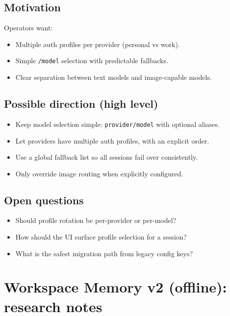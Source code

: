 \subsection{Motivation}


Operators want:

\begin{itemize}
  \item Multiple auth profiles per provider (personal vs work).
  \item Simple \texttt{/model} selection with predictable fallbacks.
  \item Clear separation between text models and image-capable models.
\end{itemize}


\subsection{Possible direction (high level)}


\begin{itemize}
  \item Keep model selection simple: \texttt{provider/model} with optional aliases.
  \item Let providers have multiple auth profiles, with an explicit order.
  \item Use a global fallback list so all sessions fail over consistently.
  \item Only override image routing when explicitly configured.
\end{itemize}


\subsection{Open questions}


\begin{itemize}
  \item Should profile rotation be per-provider or per-model?
  \item How should the UI surface profile selection for a session?
  \item What is the safest migration path from legacy config keys?
\end{itemize}



\clearpage

\section{Workspace Memory v2 (offline): research notes}


